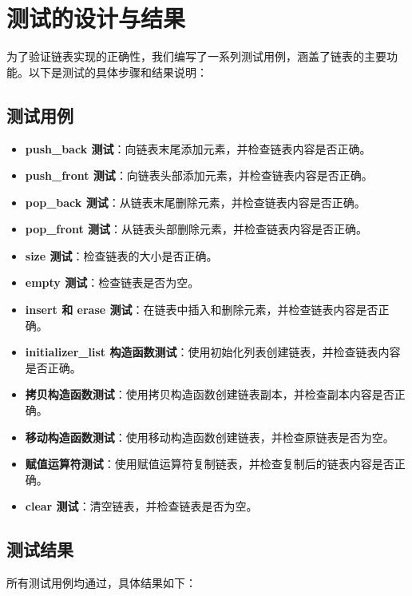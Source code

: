 \documentclass[UTF8]{ctexart}
\begin{document}
\section{测试的设计与结果}

为了验证链表实现的正确性，我们编写了一系列测试用例，涵盖了链表的主要功能。以下是测试的具体步骤和结果说明：

\subsection{测试用例}

\begin{itemize}
  \item \textbf{push\_back 测试}：向链表末尾添加元素，并检查链表内容是否正确。
  \item \textbf{push\_front 测试}：向链表头部添加元素，并检查链表内容是否正确。
  \item \textbf{pop\_back 测试}：从链表末尾删除元素，并检查链表内容是否正确。
  \item \textbf{pop\_front 测试}：从链表头部删除元素，并检查链表内容是否正确。
  \item \textbf{size 测试}：检查链表的大小是否正确。
  \item \textbf{empty 测试}：检查链表是否为空。
  \item \textbf{insert 和 erase 测试}：在链表中插入和删除元素，并检查链表内容是否正确。
  \item \textbf{initializer\_list 构造函数测试}：使用初始化列表创建链表，并检查链表内容是否正确。
  \item \textbf{拷贝构造函数测试}：使用拷贝构造函数创建链表副本，并检查副本内容是否正确。
  \item \textbf{移动构造函数测试}：使用移动构造函数创建链表，并检查原链表是否为空。
  \item \textbf{赋值运算符测试}：使用赋值运算符复制链表，并检查复制后的链表内容是否正确。
  \item \textbf{clear 测试}：清空链表，并检查链表是否为空。
\end{itemize}

\subsection{测试结果}

所有测试用例均通过，具体结果如下：
\end{document}
